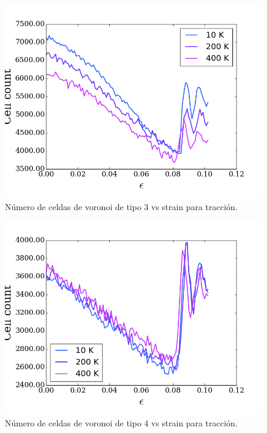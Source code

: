 \documentclass[10pt, oneside]{article} %
\begin{document}
\begin{figure}[H]
\centering
\includegraphics[width=15cm]{Figures/NanoParticles/voro_type3_tension.png}
\caption{Número de celdas de voronoi de tipo 3 vs strain para tracción.}
\end{figure}

\begin{figure}[H]
\centering
\includegraphics[width=15cm]{Figures/NanoParticles/voro_type4_tension.png}
\caption{Número de celdas de voronoi de tipo 4 vs strain para tracción.}
\end{figure}
\end{document}

